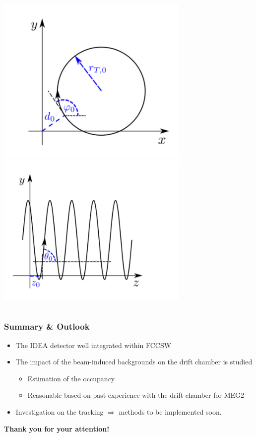 \documentclass[aspectratio=169, hyperref={colorlinks=true,pdfpagelabels=false,linkcolor=black}, xcolor=dvipsnames,10pt]{beamer}
\begin{document}
\begin{frame}
\begin{columns}
    \centering
    \includegraphics[width=0.7\textwidth]{Figures/helix_param_1.png} \\
    \hspace{0.8cm}
    \includegraphics[width=0.7\textwidth]{Figures/helix_param_2.png}

  \end{columns}

\end{frame}

\label{lastslide}
\begin{frame}
  \frametitle{Summary \& Outlook}


  \begin{itemize}
    \item The IDEA detector well integrated within FCCSW
    \item The impact of the beam-induced backgrounds on the drift chamber is studied
      \begin{itemize}
        \item Estimation of the occupancy
        \item Reasonable based on past experience with the drift chamber for MEG2
      \end{itemize}
    \item Investigation on the tracking $\Rightarrow$ methods to be implemented soon.
  \end{itemize}

  \vspace{1cm}
	\centering
	\Large{\textbf{Thank you for your attention!}}
\end{frame}
\end{document}
